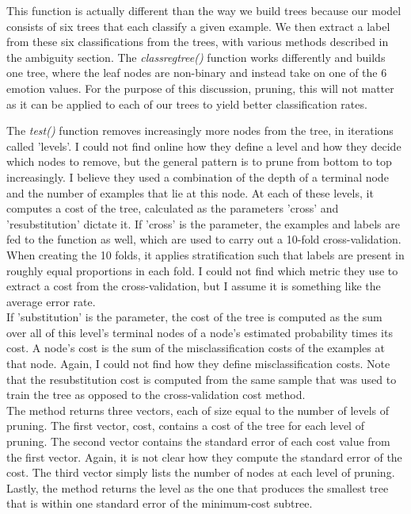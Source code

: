 This function is actually different than the way we build trees because our model consists of six trees that each classify a given
example.
We then extract a label from these six classifications from the trees, with various methods described in the ambiguity section.
The \emph{classregtree()} function works differently and builds one tree,
where the leaf nodes are non-binary and instead take on one of the 6 emotion values.
For the purpose of this discussion, pruning,
this will not matter as it can be applied to each of our trees to yield better classification rates.

The \emph{test()} function removes increasingly more nodes from the tree, in iterations called 'levels'.
I could not find online how they define a level and how they decide which nodes to remove,
but the general pattern is to prune from bottom to top increasingly.
I believe they used a combination of the depth of a terminal node and the number of examples that lie at this node.
At each of these levels, it computes a cost of the tree, calculated as the parameters 'cross' and 'resubstitution' dictate it.
If 'cross' is the parameter, the examples and labels are fed to the function as well, which are used to carry out a 10-fold
cross-validation. When creating the 10 folds, it applies stratification such that labels are present in roughly equal proportions
in each fold. I could not find which metric they use to extract a cost from the cross-validation, but I assume it is something
like the average error rate.\\
If 'substitution' is the parameter, the cost of the tree is computed as the sum over all of this level's terminal
nodes of a node's estimated probability times its cost.
A node's cost is the sum of the misclassification costs of the examples at that node.
Again, I could not find how they define misclassification costs.
Note that the resubstitution cost is computed from the same sample that was used to train the tree as opposed to the cross-validation
cost method.\\
The method returns three vectors, each of size equal to the number of levels of pruning. The first vector, cost, contains a cost
of the tree for each level of pruning. The second vector contains the standard error of each cost value from the first vector.
Again, it is not clear how they compute the standard error of the cost. The third vector simply lists the number of nodes at each
level of pruning. Lastly, the method returns the level as the one that produces the smallest tree that is within one standard
error of the minimum-cost subtree.

